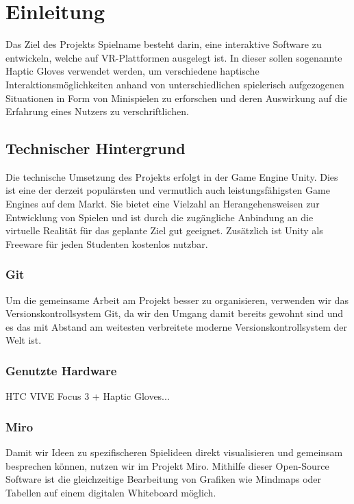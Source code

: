 \chapter{Einleitung}
Das Ziel des Projekts \dq Spielname \dq besteht darin, eine interaktive Software zu entwickeln, welche auf VR-Plattformen ausgelegt ist. In dieser sollen sogenannte \dq Haptic Gloves \dq verwendet werden, um verschiedene haptische Interaktionsmöglichkeiten anhand von unterschiedlichen spielerisch aufgezogenen Situationen in Form von Minispielen zu erforschen und deren Auswirkung auf die Erfahrung eines Nutzers zu verschriftlichen.\\
\section{Technischer Hintergrund}
Die technische Umsetzung des Projekts erfolgt in der Game Engine Unity. Dies ist eine der derzeit populärsten und vermutlich auch leistungsfähigsten Game Engines auf dem Markt. Sie bietet eine Vielzahl an Herangehensweisen zur Entwicklung von Spielen und ist durch die zugängliche Anbindung an die virtuelle Realität für das geplante Ziel gut geeignet. Zusätzlich ist Unity als Freeware für jeden Studenten kostenlos nutzbar.
\subsection{Git}
Um die gemeinsame Arbeit am Projekt besser zu organisieren, verwenden wir das Versionskontrollsystem Git, da wir den Umgang damit bereits gewohnt sind und es das mit Abstand am weitesten verbreitete moderne Versionskontrollsystem der Welt ist.
\subsection{Genutzte Hardware}
HTC VIVE Focus 3 + Haptic Gloves...
\subsection{Miro}
Damit wir Ideen zu spezifischeren Spielideen direkt visualisieren und gemeinsam besprechen können, nutzen wir im Projekt Miro. Mithilfe dieser Open-Source Software ist die gleichzeitige Bearbeitung von Grafiken wie Mindmaps oder Tabellen auf einem digitalen Whiteboard möglich.